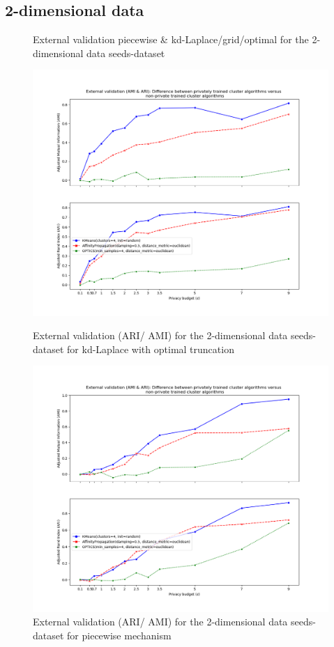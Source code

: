 \subsection{2-dimensional data}
\begin{figure}[H]
    \caption{External validation piecewise \& kd-Laplace/grid/optimal for the 2-dimensional data seeds-dataset}
    \centering
    \begin{minipage}[c]{0.49\textwidth}
        \includegraphics[width=1\textwidth]{Results/2d-laplace-optimal-truncated/seeds-dataset/ami-and-ari.png}
        \caption{External validation (ARI/ AMI) for the 2-dimensional data seeds-dataset for kd-Laplace with optimal truncation}
        \label{fig:external-validation-seeds-dataset_comparison_2d-laplace}
    \end{minipage}
    \begin{minipage}[c]{0.49\textwidth}
        \includegraphics[width=1\textwidth]{Results/2d-piecewise/seeds-dataset/ami-and-ari.png}
        \caption{External validation (ARI/ AMI) for the 2-dimensional data seeds-dataset for piecewise mechanism}
        \label{fig:external-validation-seeds-dataset_comparison_2d-piecewise}
    \end{minipage}


\end{figure}
